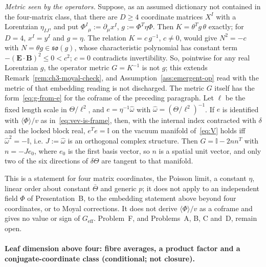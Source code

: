 \emph{Metric seen by the operators.} Suppose, as an assumed dictionary not contained in the four-matrix class, that there are \(D\ge4\) coordinate matrices \(X^I\) with a Lorentzian \(\eta_{IJ}\), and put \(\Phi^I{}_\mu:=\partial_\mu x^I\), \(g:=\Phi^T\eta\Phi\). Then \(K=\theta^{T}g\,\theta\) exactly; for \(D=4\), \(x^I=y^I\) and \(g=\eta\). The relation \(K=c\,g^{-1}\), \(c\neq0\), would give \(N^2=-c\) with \(N=\theta g\in\mathfrak{so}(g)\), whose characteristic polynomial has constant term \(-(\mathbf E\cdot\mathbf B)^2\le0<c^2\); \(c=0\) contradicts invertibility. So, pointwise for any real Lorentzian \(g\), the operator metric \(G=K^{-1}\) is not \(g\); this extends Remark~\ref{rem:ch3-moyal-check}, and Assumption~\ref{ass:emergent-op} read with the metric of that embedding reading is not discharged. The metric \(G\) itself has the form~\eqref{eq:g-from-e} for the coframe of the preceding paragraph. Let \(\ell\) be the fixed length scale in \(\Theta/\ell^2\), and \(e=\eta^{-1}\hat\omega\) with \(\hat\omega=(\Theta/\ell^2)^{-1}\). If \(e\) is identified with \(\langle\Phi\rangle/v\) as in~\eqref{eq:vev-is-frame}, then, with the internal index contracted with \(\delta\) and the locked block real, \(e^Te=\mathbb I\) on the vacuum manifold of~\eqref{eq:V} holds iff \(\hat\omega^2=-\mathbb I\), i.e. \(J:=\hat\omega\) is an orthogonal complex structure. Then \(G=\mathbb I-2nn^T\) with \(n=-Je_0\), where \(e_0\) is the first basis vector, so \(n\) is a spatial unit vector, and only two of the six directions of \(\delta\Theta\) are tangent to that manifold.



This is a statement for four matrix coordinates, the Poisson limit, a constant \(\eta\), linear order about constant \(\bar\Theta\) and generic \(p\); it does not apply to an independent field \(\Phi\) of Presentation~B, to the embedding statement above beyond four coordinates, or to Moyal corrections. It does not derive \(\langle\Phi\rangle/v\) as a coframe and gives no value or sign of \(G_{\mathrm{eff}}\). Problem~F, and Problems~A, B, C and~D, remain open.





\paragraph{Leaf dimension above four: fibre averages, a product factor and a conjugate-coordinate class (conditional; not closure).} \label{detail:sec-F-paragraphleafdimensionabovefou-29}

